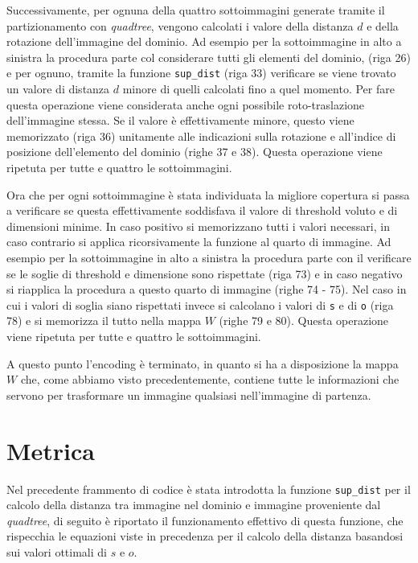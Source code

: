 \documentclass[11pt,a4paper,appendixprefix=true,numbers=noenddot]{scrreprt}
\begin{document}
Successivamente, per ognuna della quattro sottoimmagini generate tramite il partizionamento con \emph{quadtree}, vengono calcolati i valore della distanza $d$ e della rotazione dell'immagine del dominio. Ad esempio per la sottoimmagine in alto a sinistra la procedura parte col considerare tutti gli elementi del dominio, (riga 26) e per ognuno, tramite la funzione \texttt{sup\_dist} (riga 33) verificare se viene trovato un valore di distanza $d$ minore di quelli calcolati fino a quel momento. Per fare questa operazione viene considerata anche ogni possibile roto-traslazione dell'immagine stessa. Se il valore è effettivamente minore, questo viene memorizzato (riga 36) unitamente alle indicazioni sulla rotazione e all'indice di posizione dell'elemento del dominio (righe 37 e 38). Questa operazione viene ripetuta per tutte e quattro le sottoimmagini.

Ora che per ogni sottoimmagine è stata individuata la migliore copertura si passa a verificare se questa effettivamente soddisfava il valore di threshold voluto e di dimensioni minime. In caso positivo si memorizzano tutti i valori necessari, in caso contrario si applica ricorsivamente la funzione al quarto di immagine. Ad esempio per la sottoimmagine in alto a sinistra la procedura parte con il verificare se le soglie di threshold e dimensione sono rispettate (riga 73) e in caso negativo si riapplica la procedura a questo quarto di immagine (righe 74 - 75). Nel caso in cui i valori di soglia siano rispettati invece si calcolano i valori di \texttt{s} e di \texttt{o} (riga 78) e si memorizza il tutto nella mappa $W$ (righe 79 e 80).  Questa operazione viene ripetuta per tutte e quattro le sottoimmagini.

A questo punto l'encoding è terminato, in quanto si ha a disposizione la mappa $W$ che, come abbiamo visto precedentemente, contiene tutte le informazioni che servono per trasformare un immagine qualsiasi nell'immagine di partenza.

\section{Metrica}

Nel precedente frammento di codice è stata introdotta la funzione \texttt{sup\_dist} per il calcolo della distanza tra immagine nel dominio e immagine proveniente dal \emph{quadtree}, di seguito è riportato il funzionamento effettivo di questa funzione, che rispecchia le equazioni viste in precedenza per il calcolo della distanza basandosi sui valori ottimali di $s$ e $o$.
\end{document}
